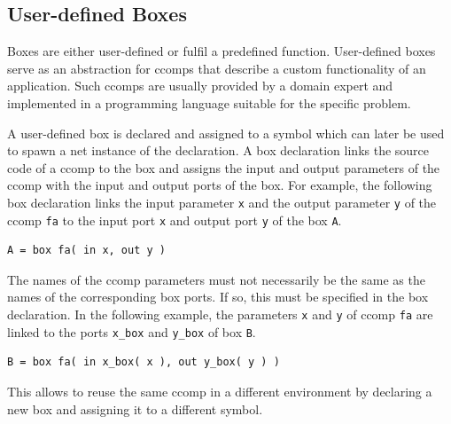 \subsection{User-defined Boxes}
\label{sect_smx_box_user}
Boxes are either user-defined or fulfil a predefined function.
User-defined boxes serve as an abstraction for \glspl*{ccomp} that describe a custom functionality of an application.
Such \glspl*{ccomp} are usually provided by a domain expert and implemented in a programming language suitable for the specific problem.

A user-defined box is declared and assigned to a symbol which can later be used to spawn a net instance of the declaration.
A box declaration links the source code of a \gls*{ccomp} to the box and assigns the input and output parameters of the \gls*{ccomp} with the input and output ports of the box.
For example, the following box declaration links the input parameter \texttt{x} and the output parameter \texttt{y} of the \gls*{ccomp} \texttt{fa} to the input port \texttt{x} and output port \texttt{y} of the box \texttt{A}.
\begin{lstlisting}[numbers=none]
A = box fa( in x, out y )
\end{lstlisting}

The names of the \gls*{ccomp} parameters must not necessarily be the same as the names of the corresponding box ports.
If so, this must be specified in the box declaration.
In the following example, the parameters \texttt{x} and \texttt{y} of \gls*{ccomp} \texttt{fa} are linked to the ports \texttt{x\_box} and \texttt{y\_box} of box \texttt{B}.
\begin{lstlisting}[numbers=none]
B = box fa( in x_box( x ), out y_box( y ) )
\end{lstlisting}
This allows to reuse the same \gls*{ccomp} in a different environment by declaring a new box and assigning it to a different symbol.

